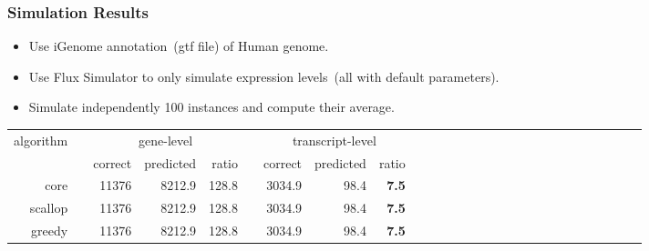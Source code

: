 \frame
{
	\frametitle{Simulation Results}

	\begin{itemize}
	\item Use iGenome annotation~(gtf file) of Human genome.
	\vspace{0.2cm}
	\item Use Flux Simulator to only simulate expression levels~(all with default parameters).
	\vspace{0.2cm}
	\item Simulate independently 100 instances and compute their average.
	\vspace{0.2cm}
	\end{itemize}

	\def\SA{\hspace*{0pt}}
	\def\SC{\hspace*{-2pt}}
	\def\SB{\hspace*{1pt}}
	\def\SD{\hspace*{4pt}}

	\begin{center}%
		\setlength{\tabcolsep}{2.8pt}%
		\begin{tabular}{rrrrrrrrrrrrrrrrrrrrrrrrrrr}%
		\hline
		\multirow{2}{*}{algorithm} &\SB& \multicolumn{3}{c}{gene-level} &\SD& \multicolumn{3}{c}{transcript-level}\\
		\cline{3-5} \cline{7-9}
		     && correct & predicted & ratio && correct & predicted & ratio\\
		\hline
		core && 11376   & 8212.9    & 128.8 && 3034.9  & 98.4      & {\bf 7.5} \\
		scallop && 11376   & 8212.9    & 128.8 && 3034.9  & 98.4      & {\bf 7.5} \\
		greedy && 11376   & 8212.9    & 128.8 && 3034.9  & 98.4      & {\bf 7.5} \\
		\hline
		\end{tabular}%
	\end{center}%
}

